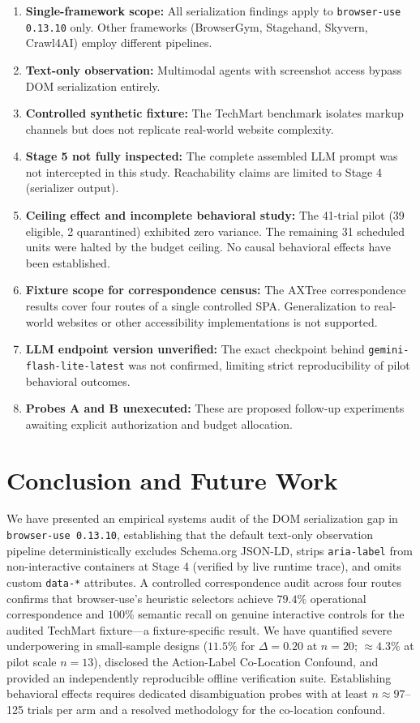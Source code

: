 \documentclass[conference]{IEEEtran}
\begin{document}
\begin{enumerate}
    \item \textbf{Single-framework scope:} All serialization findings apply to \texttt{browser-use 0.13.10} only. Other frameworks (BrowserGym, Stagehand, Skyvern, Crawl4AI) employ different pipelines.
    \item \textbf{Text-only observation:} Multimodal agents with screenshot access bypass DOM serialization entirely.
    \item \textbf{Controlled synthetic fixture:} The TechMart benchmark isolates markup channels but does not replicate real-world website complexity.
    \item \textbf{Stage 5 not fully inspected:} The complete assembled LLM prompt was not intercepted in this study. Reachability claims are limited to Stage 4 (serializer output).
    \item \textbf{Ceiling effect and incomplete behavioral study:} The 41-trial pilot (39 eligible, 2 quarantined) exhibited zero variance. The remaining 31 scheduled units were halted by the budget ceiling. No causal behavioral effects have been established.
    \item \textbf{Fixture scope for correspondence census:} The AXTree correspondence results cover four routes of a single controlled SPA. Generalization to real-world websites or other accessibility implementations is not supported.
    \item \textbf{LLM endpoint version unverified:} The exact checkpoint behind \texttt{gemini-flash-lite-latest} was not confirmed, limiting strict reproducibility of pilot behavioral outcomes.
    \item \textbf{Probes A and B unexecuted:} These are proposed follow-up experiments awaiting explicit authorization and budget allocation.
\end{enumerate}

\section{Conclusion and Future Work}
\label{sec:conclusion}

We have presented an empirical systems audit of the DOM serialization gap in \texttt{browser-use 0.13.10}, establishing that the default text-only observation pipeline deterministically excludes Schema.org JSON-LD, strips \texttt{aria-label} from non-interactive containers at Stage 4 (verified by live runtime trace), and omits custom \texttt{data-*} attributes. A controlled correspondence audit across four routes confirms that browser-use's heuristic selectors achieve $79.4\%$ operational correspondence and $100\%$ semantic recall on genuine interactive controls for the audited TechMart fixture---a fixture-specific result. We have quantified severe underpowering in small-sample designs ($11.5\%$ for $\Delta=0.20$ at $n=20$; $\approx 4.3\%$ at pilot scale $n=13$), disclosed the Action-Label Co-Location Confound, and provided an independently reproducible offline verification suite. Establishing behavioral effects requires dedicated disambiguation probes with at least $n \approx 97$--125 trials per arm and a resolved methodology for the co-location confound.
\end{document}
